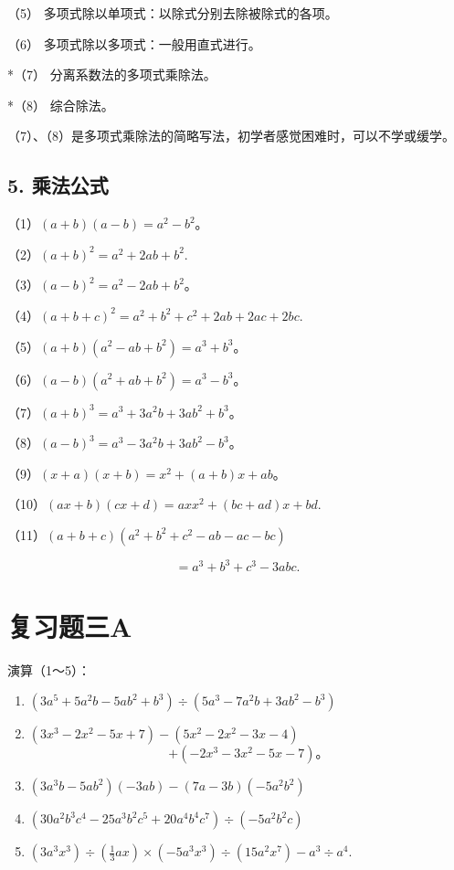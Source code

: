 （5） 多项式除以单项式：以除式分别去除被除式的各项。

（6） 多项式除以多项式：一般用直式进行。

*（7） 分离系数法的多项式乘除法。

*（8） 综合除法。

（7）、（8）是多项式乘除法的简略写法，初学者感觉困难时，可以不学或缓学。

\subsection{5. 乘法公式}

（1）\((a + b)(a - b) = a^2 - b^2\)。

（2）\((a + b)^2 = a^2 + 2ab + b^2.\)

（3）\((a - b)^2 = a^2 - 2ab + b^2\)。

（4）\((a + b + c)^2 = a^2 + b^2 + c^2 + 2ab + 2ac + 2bc.\)

（5）\((a + b)(a^2 - ab + b^2) = a^3 + b^3\)。

（6）\((a - b)(a^2 + ab + b^2) = a^3 - b^3\)。

（7）\((a + b)^3 = a^3 + 3a^2b + 3ab^2 + b^3\)。

（8）\((a - b)^{3} = a^{3} - 3a^{2}b + 3ab^{2} - b^{3}\)。

（9）\((x + a)(x + b) = x^2 + (a + b)x + ab\)。

（10）\((ax + b)(cx + d) = axx^2 + (bc + ad)x + bd.\)

（11）\((a + b + c)(a^2 + b^2 + c^2 - ab - ac - bc)\)

\[
= a ^{3} + b ^{3} + c ^{3} - 3 a b c.
\]

\section{复习题三A}

演算（1～5）：

\begin{enumerate}[start=1]
\item
  \((3a^{5} + 5a^{2}b - 5ab^{2} + b^{3})\div (5a^{3} - 7a^{2}b + 3ab^{2} - b^{3})\)
\item
  \((3x^{3} - 2x^{2} - 5x + 7) - (5x^{2} - 2x^{2} - 3x - 4)\)
\[
+ (- 2 x ^{3} - 3 x ^{2} - 5 x - 7)\text{。}
\]
\item
  \((3a^{3}b - 5ab^{2})(-3ab) - (7a - 3b)(-5a^{2}b^{2})\)
\item
  \((30a^{2}b^{3}c^{4} - 25a^{3}b^{2}c^{5} + 20a^{4}b^{4}c^{7})\div (-5a^{2}b^{2}c)\)
\item
  \((3a^{3}x^{3})\div \left(\frac{1}{3} ax\right)\times (-5a^{3}x^{3})\div (15a^{2}x^{7}) - a^{3}\div a^{4}.\)
\end{enumerate}

